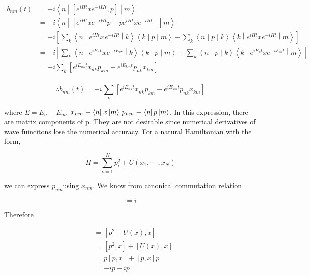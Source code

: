 \documentclass[12pt]{report}
\newcommand*{\1}{\hspace{1pt}}
\begin{document}
        \begin{align*}
            b_{nm}(t) &= -i\left\langle n \middle|\left[e^{iHt}xe^{-iHt},p\right]\middle| m\right\rangle \\
            &= -i\left\langle n \middle|\left[e^{iHt}xe^{-iHt}p - pe^{iHt}xe^{-iHt}\right]\middle| m\right\rangle \\
            &= -i\left[\sum_{k}\left\langle n \middle|e^{iHt}xe^{-iHt} \middle| k\right\rangle\left\langle k \middle| p \middle| m \right\rangle - \sum_{k}\left\langle n \middle| p \middle| k \right\rangle\left\langle k \middle|e^{iHt}xe^{-iHt} \middle | m\right\rangle\right] \\
            &= -i\left[\sum_{k}\left\langle n \middle|e^{iE_{n}t}xe^{-iE_{k}t} \middle| k\right\rangle\left\langle k \middle| p \middle| m \right\rangle - \sum_{k}\left\langle n \middle| p \middle| k \right\rangle\left\langle k \middle|e^{iE_{k}t}xe^{-iE_{m}t} \middle | m\right\rangle\right] \\
            &= -i \sum_{k}\left[e^{iE_{nk}t}x_{nk}p_{km} - e^{iE_{km}t}p_{nk}x_{km} \right] \\
        \end{align*}

        \begin{equation}
            \therefore b_{nm}(t) = -i \sum_{k}\left[e^{iE_{nk}t}x_{nk}p_{km} - e^{iE_{km}t}p_{nk}x_{km} \right]
        \end{equation}

        where $E = E_{n} - E_{m}$, $x_{nm} \equiv \bra{n}x\ket{m}$ $p_{nm} \equiv \bra{n}p\ket{m}$. In this expression, there are matrix components of p. They are not desirable since
        numerical derivatives of wave fuincitons lose the numerical accuracy. For a natural Hamiltonian with the form, 

        \begin{equation}
            H = \sum_{i=1} ^{N} p_{i}^{2} + U(x_{1}, \cdot \cdot \cdot ,  x_{N})
        \end{equation}

        we can express $p_{nm}$using $x_{nm}$. We know from canonical commutation relation 

        \begin{equation}
            [x,p] = i \tag{$\hbar=1$}
        \end{equation}

        Therefore

        \begin{align*}
            [H,x] &= [p^{2} + U(x) , x] \\
            &= [p^{2},x] + [U(x), x] \\
            &= p[p,x] + [p,x]p  \\
            &= -ip -ip  \\
        \end{align*}
\end{document}
